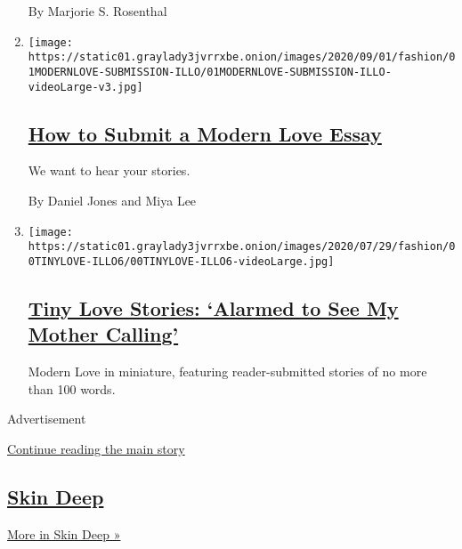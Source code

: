 \begin{enumerate}
  By Marjorie S. Rosenthal
\item
  \texttt{[image: https://static01.graylady3jvrrxbe.onion/images/2020/09/01/fashion/01MODERNLOVE-SUBMISSION-ILLO/01MODERNLOVE-SUBMISSION-ILLO-videoLarge-v3.jpg]}

  \hypertarget{how-to-submit-a-modern-love-essay}{%
  \subsection{\texorpdfstring{\href{/article/how-to-submit-a-modern-love-essay.html}{How
  to Submit a Modern Love
  Essay}}{How to Submit a Modern Love Essay}}\label{how-to-submit-a-modern-love-essay}}

  We want to hear your stories.

  By Daniel Jones and Miya Lee
\item
  \texttt{[image: https://static01.graylady3jvrrxbe.onion/images/2020/07/29/fashion/00TINYLOVE-ILLO6/00TINYLOVE-ILLO6-videoLarge.jpg]}

  \hypertarget{tiny-love-stories-alarmed-to-see-my-mother-calling}{%
  \subsection{\texorpdfstring{\href{/2020/09/01/style/tiny-modern-love-stories-alarmed-to-see-my-mother-calling.html}{Tiny
  Love Stories: `Alarmed to See My Mother
  Calling'}}{Tiny Love Stories: `Alarmed to See My Mother Calling'}}\label{tiny-love-stories-alarmed-to-see-my-mother-calling}}

  Modern Love in miniature, featuring reader-submitted stories of no
  more than 100 words.
\end{enumerate}

Advertisement

\protect\hyperlink{after-mid4}{Continue reading the main story}

\hypertarget{skin-deep-1}{%
\subsection{\texorpdfstring{\href{/column/skin-deep}{Skin
Deep}}{Skin Deep}}\label{skin-deep-1}}

\href{/column/skin-deep}{More in Skin Deep »}

